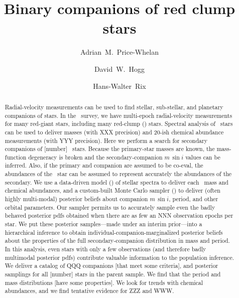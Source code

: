 \documentclass[modern, letterpaper]{aastex61}
\newcommand{\apogee}{\project{\acronym{APOGEE}}}
\newcommand{\thejoker}{\project{The~Joker}}
\newcommand{\thecannon}{\project{The~Cannon}}
\newcommand{\RC}{\acronym{RC}}
\begin{document}
\sloppy\sloppypar\raggedbottom\frenchspacing %

\title{Binary companions of red clump stars}

\author{Adrian~M.~Price-Whelan}

\author{David~W.~Hogg}

\author{Hans-Walter~Rix}

\begin{abstract}\noindent %
Radial-velocity measurements can be used to find stellar, sub-stellar,
and planetary companions of stars.
In the \apogee\ survey, we have multi-epoch radial-velocity measurements
for many red-giant stars, including many red-clump (\RC) stars.
Spectral analysis of \RC\ stars can be used to deliver masses (with
XXX precision) and 20-ish chemical abundance measurements (with YYY
precision).
Here we perform a search for secondary companions of [number] \RC\ stars.
Because the primary-star masses are known, the mass-function degeneracy
is broken and the secondary-companion $m\,\sin i$ values can be inferred.
Also, if the primary and companion are assumed to be co-eval, the
abundances of the \RC\ star can be assumed to represent accurately the
abundances of the secondary.
We use a data-driven model (\thecannon) of stellar spectra to deliver
each \RC\ mass and chemical abundances, and a custom-built Monte Carlo
sampler (\thejoker) to deliver (often highly multi-modal) posterior
beliefs about companion $m\,\sin i$, period, and other orbital parameters.
Our sampler permits us to accurately sample even the badly behaved
posterior pdfs obtained when there are as few an NNN observation
epochs per star.
We put these posterior samples---made under an interim prior---into a
hierarchical inference to obtain individual-companion-marginalized
posterior beliefs about the properties of the full secondary-companion
distribution in mass and period.
In this analysis, even stars with only a few observations (and therefore
badly multimodal posterior pdfs) contribute valuable information to the
population inference.
We deliver a catalog of QQQ companions [that meet some criteria], and
posterior samplings for all [number] stars in the parent sample.
We find that the period and mass distributions [have some properties].
We look for trends with chemical abundances, and we find tentative evidence
for ZZZ and WWW.
\end{abstract}
\end{document}
